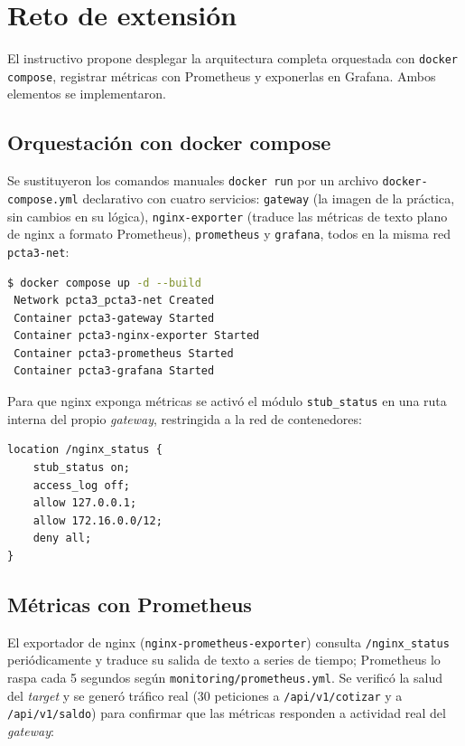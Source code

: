 \section{Reto de extensión}
\label{sec:p3-reto}

El instructivo propone desplegar la arquitectura completa orquestada con \texttt{docker compose}, registrar métricas con Prometheus y exponerlas en Grafana. Ambos elementos se implementaron.

\subsection*{Orquestación con docker compose}

Se sustituyeron los comandos manuales \texttt{docker run} por un archivo \texttt{docker-compose.yml} declarativo con cuatro servicios: \texttt{gateway} (la imagen de la práctica, sin cambios en su lógica), \texttt{nginx-exporter} (traduce las métricas de texto plano de nginx a formato Prometheus), \texttt{prometheus} y \texttt{grafana}, todos en la misma red \texttt{pcta3-net}:

\begin{lstlisting}[language=bash]
$ docker compose up -d --build
 Network pcta3_pcta3-net Created
 Container pcta3-gateway Started
 Container pcta3-nginx-exporter Started
 Container pcta3-prometheus Started
 Container pcta3-grafana Started
\end{lstlisting}

Para que nginx exponga métricas se activó el módulo \texttt{stub\_status} en una ruta interna del propio \emph{gateway}, restringida a la red de contenedores:

\begin{lstlisting}
location /nginx_status {
    stub_status on;
    access_log off;
    allow 127.0.0.1;
    allow 172.16.0.0/12;
    deny all;
}
\end{lstlisting}

\subsection*{Métricas con Prometheus}

El exportador de nginx (\texttt{nginx-prometheus-exporter}) consulta \texttt{/nginx\_status} periódicamente y traduce su salida de texto a series de tiempo; Prometheus lo raspa cada 5 segundos según \texttt{monitoring/prometheus.yml}. Se verificó la salud del \emph{target} y se generó tráfico real (30 peticiones a \texttt{/api/v1/cotizar} y a \texttt{/api/v1/saldo}) para confirmar que las métricas responden a actividad real del \emph{gateway}:

